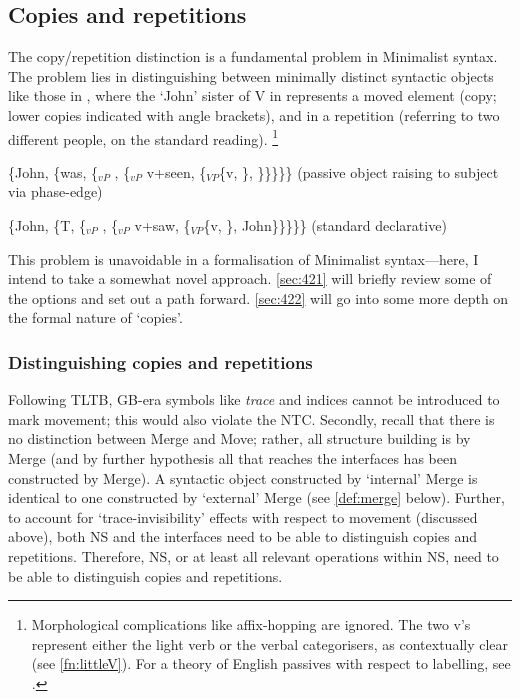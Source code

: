\subsection{Copies and repetitions}\label{sec:420}

The copy/repetition distinction is a fundamental problem in Minimalist syntax. The problem lies in distinguishing between minimally distinct syntactic objects like those in , where the `John' sister of V in  represents a moved element (copy; lower copies indicated with angle brackets), and in  a repetition (referring to two different people, on the standard reading).%
\footnote{Morphological complications like affix-hopping \parencite{ChomskyN_1975a} are ignored. The two v's represent either the light verb or the verbal categorisers, as contextually clear (see \autoref{fn:littleV}). For a theory of English passives with respect to labelling, see \textcite{BurrowsER_2022}.}

\begin{subexamples}\label{ex:coprep}
    \item\label{ex:coprep:cop} \{John, \{was, \{$_{vP}$ , \{$_{vP}$ v+seen, \{$_{VP}$\{v, \}, \}\}\}\}\} (passive object raising to subject via phase-edge)
    \item\label{ex:coprep:rep} \{John, \{T, \{$_{vP}$ , \{$_{vP}$ v+saw, \{$_{VP}$\{v, \}, John\}\}\}\}\} (standard declarative)
\end{subexamples}

This problem is unavoidable in a formalisation of Minimalist syntax---here, I intend to take a somewhat novel approach. \autoref{sec:421} will briefly review some of the options and set out a path forward. \autoref{sec:422} will go into some more depth on the formal nature of `copies'.

\subsubsection{Distinguishing copies and repetitions}\label{sec:421}

Following TLTB, GB-era symbols like \textit{trace} and indices cannot be introduced to mark movement; this would also violate the NTC. Secondly, recall that there is no distinction between Merge and Move; rather, all structure building is by Merge (and by further hypothesis all that reaches the interfaces has been constructed by Merge). A syntactic object constructed by `internal' Merge is identical to one constructed by `external' Merge (see \autoref{def:merge} below). Further, to account for `trace-invisibility' effects with respect to movement (discussed above), both NS and the interfaces need to be able to distinguish copies and repetitions. Therefore, NS, or at least all relevant operations within NS, need to be able to distinguish copies and repetitions.

